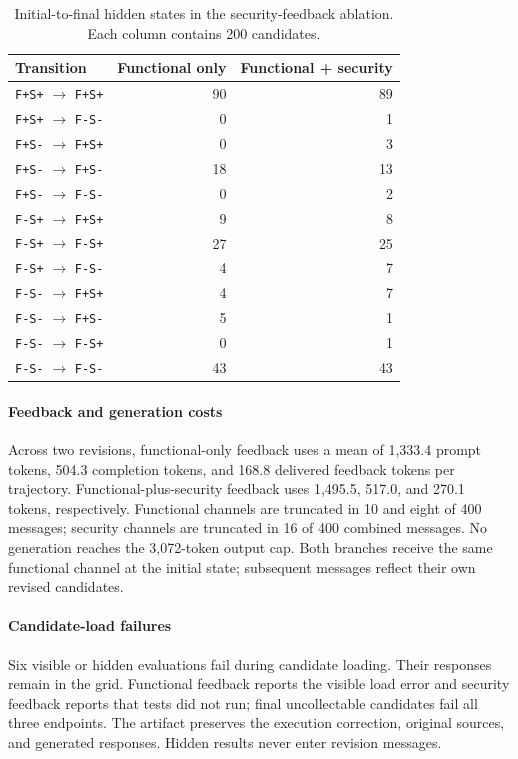 \begin{table}[pos=htbp]
\caption{Initial-to-final hidden states in the security-feedback ablation. Each column contains 200 candidates.}
\centering\small
\begin{tabular}{lrr}
\toprule
Transition & Functional only & Functional + security \\
\midrule
\texttt{F+S+} $\rightarrow$ \texttt{F+S+} & 90 & 89 \\
\texttt{F+S+} $\rightarrow$ \texttt{F-S-} & 0 & 1 \\
\texttt{F+S-} $\rightarrow$ \texttt{F+S+} & 0 & 3 \\
\texttt{F+S-} $\rightarrow$ \texttt{F+S-} & 18 & 13 \\
\texttt{F+S-} $\rightarrow$ \texttt{F-S-} & 0 & 2 \\
\texttt{F-S+} $\rightarrow$ \texttt{F+S+} & 9 & 8 \\
\texttt{F-S+} $\rightarrow$ \texttt{F-S+} & 27 & 25 \\
\texttt{F-S+} $\rightarrow$ \texttt{F-S-} & 4 & 7 \\
\texttt{F-S-} $\rightarrow$ \texttt{F+S+} & 4 & 7 \\
\texttt{F-S-} $\rightarrow$ \texttt{F+S-} & 5 & 1 \\
\texttt{F-S-} $\rightarrow$ \texttt{F-S+} & 0 & 1 \\
\texttt{F-S-} $\rightarrow$ \texttt{F-S-} & 43 & 43 \\
\bottomrule
\end{tabular}
\end{table}
\FloatBarrier
\paragraph{Feedback and generation costs}
Across two revisions, functional-only feedback uses a mean of 1,333.4 prompt tokens, 504.3 completion tokens, and 168.8 delivered feedback tokens per trajectory. Functional-plus-security feedback uses 1,495.5, 517.0, and 270.1 tokens, respectively. Functional channels are truncated in 10 and eight of 400 messages; security channels are truncated in 16 of 400 combined messages. No generation reaches the 3,072-token output cap. Both branches receive the same functional channel at the initial state; subsequent messages reflect their own revised candidates.

\paragraph{Candidate-load failures}
Six visible or hidden evaluations fail during candidate loading. Their responses remain in the grid. Functional feedback reports the visible load error and security feedback reports that tests did not run; final uncollectable candidates fail all three endpoints. The artifact preserves the execution correction, original sources, and generated responses. Hidden results never enter revision messages.
